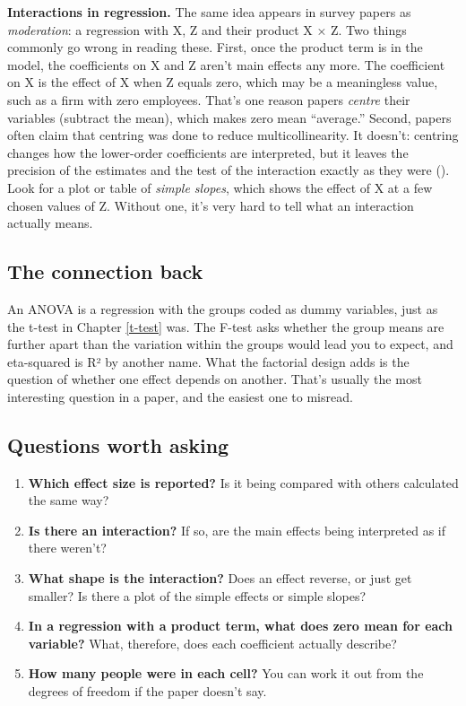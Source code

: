 \documentclass[
]{book}
\providecommand{\tightlist}{%
  \setlength{\itemsep}{0pt}\setlength{\parskip}{0pt}}
\begin{document}
\textbf{Interactions in regression.} The same idea appears in survey papers as \emph{moderation}: a regression with X, Z and their product X × Z. Two things commonly go wrong in reading these. First, once the product term is in the model, the coefficients on X and Z aren't main effects any more. The coefficient on X is the effect of X when Z equals zero, which may be a meaningless value, such as a firm with zero employees. That's one reason papers \emph{centre} their variables (subtract the mean), which makes zero mean ``average.'' Second, papers often claim that centring was done to reduce multicollinearity. It doesn't: centring changes how the lower-order coefficients are interpreted, but it leaves the precision of the estimates and the test of the interaction exactly as they were (). Look for a plot or table of \emph{simple slopes}, which shows the effect of X at a few chosen values of Z. Without one, it's very hard to tell what an interaction actually means.

\subsection{The connection back}\label{the-connection-back-8}

An ANOVA is a regression with the groups coded as dummy variables, just as the t-test in Chapter \ref{t-test} was. The F-test asks whether the group means are further apart than the variation within the groups would lead you to expect, and eta-squared is R² by another name. What the factorial design adds is the question of whether one effect depends on another. That's usually the most interesting question in a paper, and the easiest one to misread.

\subsection{Questions worth asking}\label{questions-worth-asking-8}

\begin{enumerate}
\def\labelenumi{\arabic{enumi}.}
\tightlist
\item
  \textbf{Which effect size is reported?} Is it being compared with others calculated the same way?
\item
  \textbf{Is there an interaction?} If so, are the main effects being interpreted as if there weren't?
\item
  \textbf{What shape is the interaction?} Does an effect reverse, or just get smaller? Is there a plot of the simple effects or simple slopes?
\item
  \textbf{In a regression with a product term, what does zero mean for each variable?} What, therefore, does each coefficient actually describe?
\item
  \textbf{How many people were in each cell?} You can work it out from the degrees of freedom if the paper doesn't say.
\end{enumerate}
\end{document}
